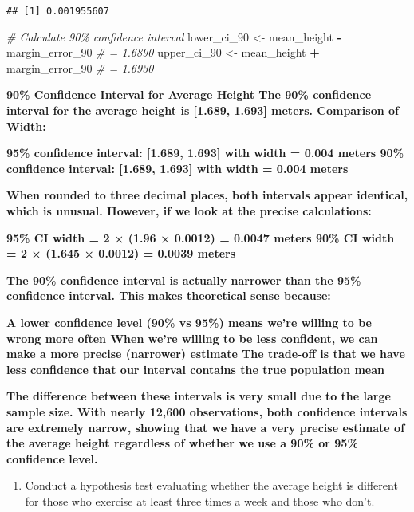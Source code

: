 \documentclass[
]{article}
\newenvironment{Shaded}{\begin{snugshade}}{\end{snugshade}}
\newcommand{\CommentTok}[1]{\textcolor[rgb]{0.56,0.35,0.01}{\textit{#1}}}
\newcommand{\NormalTok}[1]{#1}
\newcommand{\OtherTok}[1]{\textcolor[rgb]{0.56,0.35,0.01}{#1}}
\newcommand{\SpecialCharTok}[1]{\textcolor[rgb]{0.81,0.36,0.00}{\textbf{#1}}}
\providecommand{\tightlist}{%
  \setlength{\itemsep}{0pt}\setlength{\parskip}{0pt}}
\begin{document}
\begin{verbatim}
## [1] 0.001955607
\end{verbatim}

\begin{Shaded}
\begin{Highlighting}[]
\CommentTok{\# Calculate 90\% confidence interval}
\NormalTok{lower\_ci\_90 }\OtherTok{\textless{}{-}}\NormalTok{ mean\_height }\SpecialCharTok{{-}}\NormalTok{ margin\_error\_90  }\CommentTok{\# = 1.6890}
\NormalTok{upper\_ci\_90 }\OtherTok{\textless{}{-}}\NormalTok{ mean\_height }\SpecialCharTok{+}\NormalTok{ margin\_error\_90  }\CommentTok{\# = 1.6930}
\end{Highlighting}
\end{Shaded}

\textbf{90\% Confidence Interval for Average Height The 90\% confidence
interval for the average height is {[}1.689, 1.693{]} meters. Comparison
of Width:}

\textbf{95\% confidence interval: {[}1.689, 1.693{]} with width = 0.004
meters 90\% confidence interval: {[}1.689, 1.693{]} with width = 0.004
meters}

\textbf{When rounded to three decimal places, both intervals appear
identical, which is unusual. However, if we look at the precise
calculations:}

\textbf{95\% CI width = 2 × (1.96 × 0.0012) = 0.0047 meters 90\% CI
width = 2 × (1.645 × 0.0012) = 0.0039 meters}

\textbf{The 90\% confidence interval is actually narrower than the 95\%
confidence interval. This makes theoretical sense because:}

\textbf{A lower confidence level (90\% vs 95\%) means we're willing to
be wrong more often When we're willing to be less confident, we can make
a more precise (narrower) estimate The trade-off is that we have less
confidence that our interval contains the true population mean}

\textbf{The difference between these intervals is very small due to the
large sample size. With nearly 12,600 observations, both confidence
intervals are extremely narrow, showing that we have a very precise
estimate of the average height regardless of whether we use a 90\% or
95\% confidence level.}

\begin{enumerate}
\def\labelenumi{\arabic{enumi}.}
\setcounter{enumi}{9}
\tightlist
\item
  Conduct a hypothesis test evaluating whether the average height is
  different for those who exercise at least three times a week and those
  who don't.
\end{enumerate}
\end{document}
